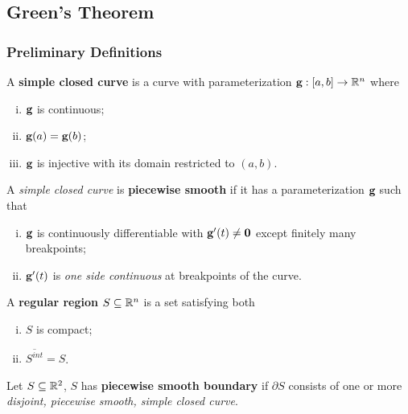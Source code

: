 \documentclass[11pt]{article}
\begin{document}
		\subsection{Green's Theorem}
			\subsubsection{Preliminary Definitions}
				\begin{definition}
					A \textbf{simple closed curve} is a curve with parameterization $\textbf{g}: [a, b] \to \mathbb{R}^n$ where
					\begin{enumerate}[(i)]
						\item $\textbf{g}$ is continuous;
						\item $\textbf{g}(a) = \textbf{g}(b)$;
						\item $\textbf{g}$ is injective with its domain restricted to $(a, b)$.
					\end{enumerate}
				\end{definition}
				
				\begin{definition}
					A \emph{simple closed curve} is \textbf{piecewise smooth} if it has a parameterization $\textbf{g}$ such that
					\begin{enumerate}[(i)]
						\item $\textbf{g}$ is continuously differentiable with $\textbf{g}'(t) \neq \textbf{0}$ except finitely many breakpoints;
						\item $\textbf{g}'(t)$ is \emph{one side continuous} at breakpoints of the curve.
					\end{enumerate}
				\end{definition}
				
				\begin{definition}
					A \textbf{regular region} $S \subseteq \mathbb{R}^n$ is a set satisfying both
					\begin{enumerate}[(i)]
						\item $S$ is compact;
						\item $\overline{S^{int}} = S$.
					\end{enumerate}
				\end{definition}
				
				\begin{definition}
					Let $S \subseteq \mathbb{R}^2$, $S$ has \textbf{piecewise smooth boundary} if $\partial S$ consists of one or more \emph{disjoint, piecewise smooth, simple closed curve}.
				\end{definition}
				
\end{document}
